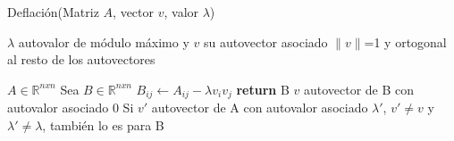 
\begin{algorithm}[H]
\caption{Deflación(Matriz $A$, vector $v$, valor $\lambda$)}
\label{pseudo:deflacion}
\begin{algorithmic}
\REQUIRE $\lambda$ autovalor de módulo máximo y $v$ su autovector asociado 
\REQUIRE $\|v\|$=1 y ortogonal al resto de los autovectores

\REQUIRE $A \in \mathbb{R}^{nxn}$
\STATE Sea $B \in \mathbb{R}^{nxn}$
		\STATE $B_{ij} \leftarrow A_{ij} - \lambda v_{i} v_{j}$
	\ENDFOR
\ENDFOR
\STATE \textbf{return} B
\ENSURE $v$ autovector de B con autovalor asociado 0
\ENSURE Si $v'$ autovector de A con autovalor asociado $\lambda '$, $v' \neq v$ y $\lambda' \neq \lambda$, también lo es para B
\end{algorithmic}
\end{algorithm}
